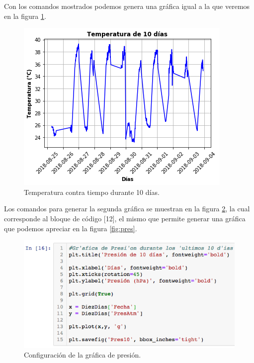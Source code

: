 \documentclass[12pt]{article}
\begin{document}
Con los comandos mostrados podemos genera una gráfica igual a la que veremos en la figura \ref{fig:tempe}.

\begin{figure}[h!]
	\center
	\includegraphics[scale=.6]{Tempe10}
	\caption{\label{fig:tempe} Temperatura contra tiempo durante 10 días.}
\end{figure}

Los comandos para generar la segunda gráfica se muestran en la figura \ref{fig:config2}, la cual corresponde al bloque de código [12], el mismo que permite generar una gráfica que podemos apreciar en la figura \ref{fig:pres}.

\begin{figure}[h!]
	\center
	\includegraphics[scale=.58]{./Images/config2}
	\caption{\label{fig:config2} Configuración de la gráfica de presión.}
\end{figure}
\end{document}
